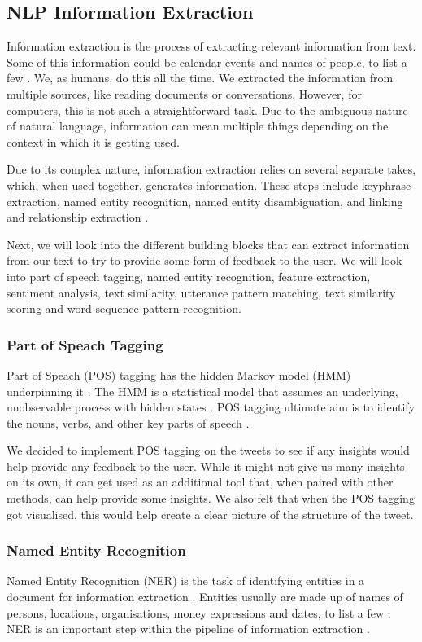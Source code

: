 	\subsection{NLP Information Extraction}
	Information extraction is the process of extracting relevant information from text. Some of this information could be calendar events and names of people, to list a few \cite{vajjala2020practical}. We, as humans, do this all the time. We extracted the information from multiple sources, like reading documents or conversations. However, for computers, this is not such a straightforward task. Due to the ambiguous nature of natural language, information can mean multiple things depending on the context in which it is getting used.
	
	Due to its complex nature, information extraction relies on several separate takes, which, when used together, generates information. These steps include keyphrase extraction, named entity recognition, named entity disambiguation, and linking and relationship extraction \cite{vajjala2020practical}.
	
	Next, we will look into the different building blocks that can extract information from our text to try to provide some form of feedback to the user. We will look into part of speech tagging, named entity recognition, feature extraction, sentiment analysis, text similarity, utterance pattern matching, text similarity scoring and word sequence pattern recognition.
	
	\subsubsection{Part of Speach Tagging}
	Part of Speach (POS) tagging has the hidden Markov model (HMM) underpinning it \cite{vajjala2020practical}. The HMM is a statistical model that assumes an underlying, unobservable process with hidden states \cite{baum1966statistical}. POS tagging ultimate aim is to identify the nouns, verbs, and other key parts of speech \cite{vasiliev2020natural}.
	
	We decided to implement POS tagging on the tweets to see if any insights would help provide any feedback to the user. While it might not give us many insights on its own, it can get used as an additional tool that, when paired with other methods, can help provide some insights. We also felt that when the POS tagging got visualised, this would help create a clear picture of the structure of the tweet.
	
	
	\subsubsection{Named Entity Recognition}
	Named Entity Recognition (NER) is the task of identifying entities in a document for information extraction \cite{vajjala2020practical}. Entities usually are made up of names of persons, locations, organisations, money expressions and dates, to list a few \cite{hapke2019natural}. NER is an important step within the pipeline of information extraction \cite{vajjala2020practical}.
	
